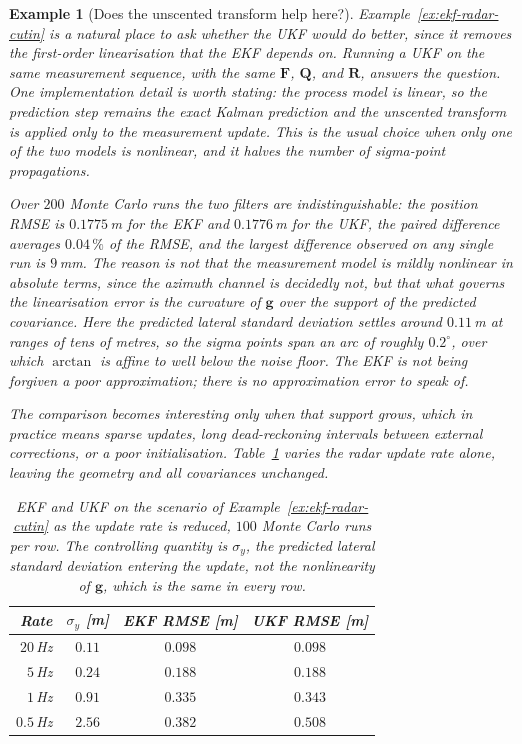 \documentclass[11pt,oneside,openany]{book}
\newtheorem{example}{Example}[chapter]
\begin{document}
\begin{example}[Does the unscented transform help here?]
\label{ex:ukf-radar-cutin}
Example~\ref{ex:ekf-radar-cutin} is a natural place to ask whether the UKF
would do better, since it removes the first-order linearisation that the EKF
depends on. Running a UKF on the same measurement sequence, with the same
$\mathbf{F}$, $\mathbf{Q}$, and $\mathbf{R}$, answers the question. One
implementation detail is worth stating: the process model is linear, so the
prediction step remains the exact Kalman prediction and the unscented transform
is applied only to the measurement update. This is the usual choice when only
one of the two models is nonlinear, and it halves the number of sigma-point
propagations.

Over $200$ Monte Carlo runs the two filters are indistinguishable: the position
RMSE is $0.1775$\,m for the EKF and $0.1776$\,m for the UKF, the paired
difference averages $0.04\,\%$ of the RMSE, and the largest difference observed
on any single run is $9$\,mm. The reason is not that the measurement model is
mildly nonlinear in absolute terms, since the azimuth channel is decidedly not,
but that what governs the linearisation error is the curvature of
$\mathbf{g}$ \emph{over the support of the predicted covariance}. Here the
predicted lateral standard deviation settles around $0.11$\,m at ranges of tens
of metres, so the sigma points span an arc of roughly $0.2^{\circ}$, over which
$\arctan$ is affine to well below the noise floor. The EKF is not being
forgiven a poor approximation; there is no approximation error to speak of.

The comparison becomes interesting only when that support grows, which in
practice means sparse updates, long dead-reckoning intervals between external
corrections, or a poor initialisation. Table~\ref{tab:ekf-ukf-rate} varies the
radar update rate alone, leaving the geometry and all covariances unchanged.

\begin{table}[!t]
\centering
\small
\caption{EKF and UKF on the scenario of
Example~\ref{ex:ekf-radar-cutin} as the update rate is reduced, $100$ Monte
Carlo runs per row. The controlling quantity is $\sigma_y$, the predicted
lateral standard deviation entering the update, not the nonlinearity of
$\mathbf{g}$, which is the same in every row.}
\label{tab:ekf-ukf-rate}
\begin{tabular}{r c c c}
\hline
\textbf{Rate} & \textbf{$\sigma_y$ [m]} & \textbf{EKF RMSE [m]} & \textbf{UKF RMSE [m]}\\
\hline
$20$\,Hz  & $0.11$ & $0.098$ & $0.098$\\
$5$\,Hz   & $0.24$ & $0.188$ & $0.188$\\
$1$\,Hz   & $0.91$ & $0.335$ & $0.343$\\
$0.5$\,Hz & $2.56$ & $0.382$ & $0.508$\\
\hline
\end{tabular}
\end{table}


\end{example}
\end{document}
